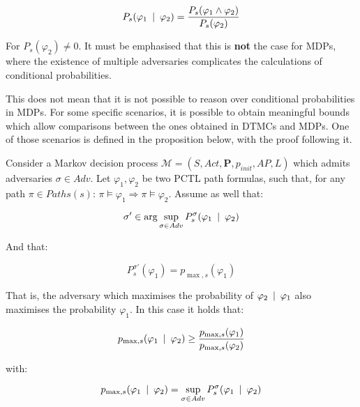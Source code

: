 \begin{equation}
	P_s (\varphi_1 \:\mid\: \varphi_2) = \frac{P_s (\varphi_1 \wedge \varphi_2)}{P_s (\varphi_2)}
\end{equation}

For $P_s (\varphi_2) \neq 0$. It must be emphasised that this is \textbf{not} the case for MDPs, where the existence of multiple adversaries complicates the calculations of conditional probabilities.

This does not mean that it is not possible to reason over conditional probabilities in MDPs. For some specific scenarios, it is possible to obtain meaningful bounds which allow comparisons between the ones obtained in DTMCs and MDPs. One of those scenarios is defined in the proposition below, with the proof following it.

\begin{proposition}
Consider a Markov decision process $\mathcal{M} = (S, Act, \mathbf{P}, p_{init}, AP, L)$ which admits adversaries $\sigma \in Adv$. Let $\varphi_1, \varphi_2$ be two PCTL path formulas, such that, for any path $\pi \in Paths(s)$: $\pi \models \varphi_1 \Rightarrow \pi \models \varphi_2$. Assume as well that:

\begin{equation}
	\sigma' \in \arg\sup_{\sigma \in Adv} P^{\sigma}_s (\varphi_1 \:\mid\: \varphi_2)
\end{equation}

And that:

\begin{equation}
	P^{\sigma'}_s (\varphi_1) = p_{\max, s} (\varphi_1)
\end{equation}

That is, the adversary which maximises the probability of $\varphi_2 \:\mid\: \varphi_1$ also maximises the probability $\varphi_1$. In this case it holds that:

\begin{equation}
	p_{\max, s} (\varphi_1 \:\mid\: \varphi_2) \geq \frac{p_{\max, s} (\varphi_1)}{p_{\max, s} (\varphi_2)}
\end{equation}

with:

\begin{equation}
	p_{\max, s} (\varphi_1 \:\mid\: \varphi_2) = \sup_{\sigma \in Adv} P^{\sigma}_s (\varphi_1 \:\mid\: \varphi_2)
\end{equation}

\end{proposition}
 
